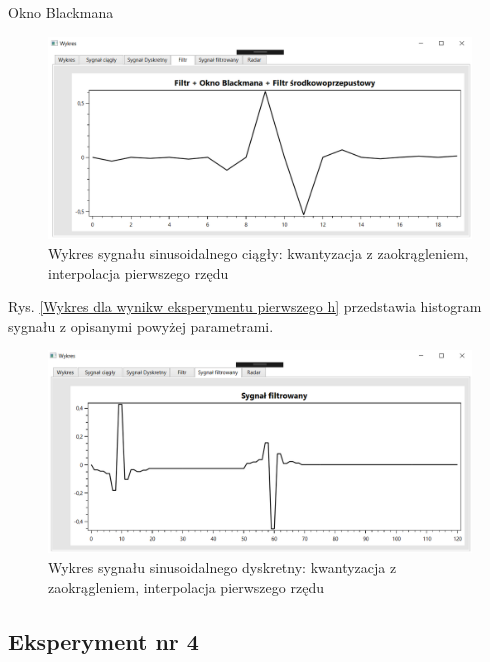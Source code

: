 \documentclass[12pt]{article}
\begin{document}
\newpage
Okno Blackmana
\begin{figure}[h!]
 \centering
 \includegraphics[width=12.3cm]{prostFSOB.PNG}
 \vspace{-0.3cm}
 \caption{Wykres sygnału sinusoidalnego ciągły: kwantyzacja z zaokrągleniem, interpolacja pierwszego rzędu}
 \label{Wykres dla wyników eksperymentu drugiego}
\end{figure}
\newpage
Rys. \ref{Wykres dla wynikw eksperymentu pierwszego h} przedstawia histogram sygnału z opisanymi powyżej parametrami. 
\begin{figure}[h!]
 \centering
 \includegraphics[width=12.3cm]{prostSFSB.PNG}
 \vspace{-0.3cm}
 \caption{Wykres sygnału sinusoidalnego dyskretny: kwantyzacja z zaokrągleniem, interpolacja pierwszego rzędu}
 \label{Histogram dla wyników eksperymentu drugiego}
\end{figure}



\subsection{Eksperyment nr 4}
\end{document}
